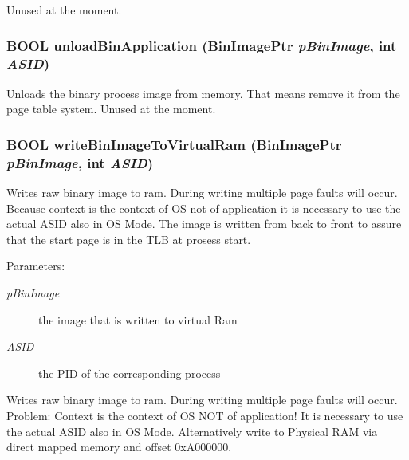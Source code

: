 Unused at the moment. \hypertarget{group___v_m_m___l_d_r_gef6344ddde662c01f04ed17a53e80291}{
\subsubsection[{unloadBinApplication}]{\setlength{\rightskip}{0pt plus 5cm}BOOL unloadBinApplication (BinImagePtr {\em pBinImage}, \/  int {\em ASID})}}
\label{group___v_m_m___l_d_r_gef6344ddde662c01f04ed17a53e80291}


Unloads the binary process image from memory. That means remove it from the page table system. Unused at the moment. \hypertarget{group___v_m_m___l_d_r_g2774925688551490cf567ca10eddd33c}{
\subsubsection[{writeBinImageToVirtualRam}]{\setlength{\rightskip}{0pt plus 5cm}BOOL writeBinImageToVirtualRam (BinImagePtr {\em pBinImage}, \/  int {\em ASID})}}
\label{group___v_m_m___l_d_r_g2774925688551490cf567ca10eddd33c}


Writes raw binary image to ram. During writing multiple page faults will occur. Because context is the context of OS not of application it is necessary to use the actual ASID also in OS Mode. The image is written from back to front to assure that the start page is in the TLB at prosess start. \begin{Desc}
\item[Parameters:]
\begin{description}
\item[{\em pBinImage}]the image that is written to virtual Ram \item[{\em ASID}]the PID of the corresponding process\end{description}
\end{Desc}
Writes raw binary image to ram. During writing multiple page faults will occur. Problem: Context is the context of OS NOT of application! It is necessary to use the actual ASID also in OS Mode. Alternatively write to Physical RAM via direct mapped memory and offset 0xA000000. 